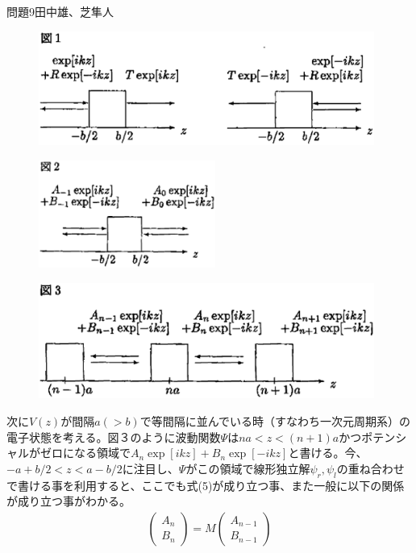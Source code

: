 \documentclass[fleqn]{jbook}
\begin{document}
\begin{question}{問題9}{田中雄、芝隼人}
\begin{figure}[h]
  \begin{center}
    \includegraphics[width=110mm]{2003phy9-1.eps}
  \end{center}
\end{figure}

\begin{figure}[h]
  \begin{center}
    \includegraphics[width=58mm]{2003phy9-2.eps}
  \end{center}
\end{figure}

\begin{figure}[h]
  \begin{center}
    \includegraphics[width=110mm]{2003phy9-3.eps}
  \end{center}
\end{figure}

次に$V(z)$が間隔$a (>b)$で等間隔に並んでいる時（すなわち一次元周期系）の電子状態を考える。図３のように波動関数$\Psi$は$na<z< (n+1)a$かつポテンシャルがゼロになる領域で$A_n \exp [ikz] +B_n \exp [-ikz]$と書ける。今、$-a+b/2 < z< a-b/2$に注目し、$\Psi$がこの領域で線形独立解$\psi_r,\psi_l$の重ね合わせで書ける事を利用すると、ここでも式(5)が成り立つ事、また一般に以下の関係が成り立つ事がわかる。
\begin{eqnarray}
\left( \begin{array}{c}{}
A_n \\ B_n 
\end{array}\right) =M \left(
\begin{array}{c}{}
A_{n-1} \\ B_{n-1}
\end{array} \right) 
\end{eqnarray}


\end{question}
\end{document}
